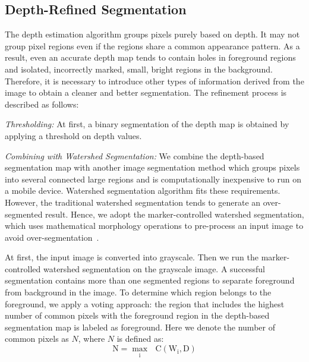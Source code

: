 \subsection{Depth-Refined Segmentation}
\label{sec:algo_drs}


The depth estimation algorithm groups pixels purely based on depth. It may not group pixel regions even if the regions share a common appearance pattern. As a result, even an accurate depth map tends to contain holes in foreground regions and isolated, incorrectly marked, small, bright regions in the background. Therefore, it is necessary to introduce other types of information derived from the image to obtain a cleaner and better segmentation. The refinement process is described as follows:

	\vspace{.5em}
	\textit{Thresholding:} At first, a binary segmentation of the depth map is obtained by applying a threshold on depth values.

	\vspace{.5em}
	\textit{Combining with Watershed Segmentation:} We combine the depth-based segmentation map with another image segmentation method which groups pixels into several connected large regions and is computationally inexpensive to run on a mobile device. Watershed segmentation algorithm fits these requirements. However, the traditional watershed segmentation tends to generate an over-segmented result. Hence, we adopt the marker-controlled watershed segmentation, which uses mathematical morphology operations to pre-process an input image to avoid over-segmentation~\cite{hirschmuller2005accurate}.

	At first, the input image is converted into grayscale. Then we run the marker-controlled watershed segmentation on the grayscale image. A successful segmentation contains more than one segmented regions to separate foreground from background in the image. To determine which region belongs to the foreground, we apply a voting approach: the region that includes the highest number of common pixels with the foreground region in the depth-based segmentation map is labeled as foreground. Here we denote the number of common pixels as $N$, where $N$ is defined as:
	\begin{equation}
		\mathrm{N = \max_i\mbox{ }C(W_i, D)}
	\end{equation}

